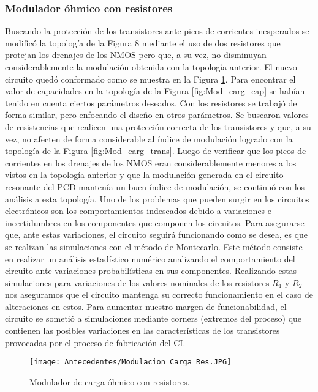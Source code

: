 \subsubsection{Modulador óhmico con resistores}
Buscando la protección de los transistores
ante picos de corrientes inesperados se
modificó la topología de la Figura 8 mediante
el uso de dos resistores que protejan los
drenajes de los NMOS pero que, a su vez, no
disminuyan considerablemente la modulación
obtenida con la topología anterior. El nuevo
circuito quedó conformado como se muestra
en la Figura \ref{fig:Mod_carg_res}.
Para encontrar el valor de capacidades en la
topología de la Figura \ref{fig:Mod_carg_cap} se habían tenido en
cuenta ciertos parámetros deseados. Con los
resistores se trabajó de forma similar, pero
enfocando el diseño en otros parámetros. Se
buscaron valores de resistencias que realicen
una protección correcta de los transistores y
que, a su vez, no afecten de forma considerable
al índice de modulación logrado con la
topología de la Figura \ref{fig:Mod_carg_trans}.
Luego de verificar que los picos de corrientes
en los drenajes de los NMOS eran considerablemente
menores a los vistos en la topología
anterior y que la modulación generada en el
circuito resonante del PCD mantenía un buen
índice de modulación, se continuó con los análisis
a esta topología.
Uno de los problemas que pueden surgir en los
circuitos electrónicos son los comportamientos
indeseados debido a variaciones e incertidumbres
en los componentes que componen los
circuitos. Para asegurarse que, ante estas variaciones,
el circuito seguirá funcionando como
se desea, es que se realizan las simulaciones
con el método de Montecarlo. Este método
consiste en realizar un análisis estadístico numérico
analizando el comportamiento del circuito
ante variaciones probabilísticas en sus
componentes. Realizando estas simulaciones
para variaciones de los valores nominales de
los resistores $R_1$ y $R_2$ nos aseguramos que el
circuito mantenga su correcto funcionamiento
en el caso de alteraciones en estos.
Para aumentar nuestro margen de funcionabilidad,
el circuito se sometió a simulaciones
mediante corners (extremos del proceso) que
contienen las posibles variaciones en las características
de los transistores provocadas por el
proceso de fabricación del CI.

\begin{figure}[H]
\centering
\texttt{[image: Antecedentes/Modulacion\_Carga\_Res.JPG]}
\caption{Modulador de carga óhmico con resistores.}
\label{fig:Mod_carg_res}
\end{figure}

